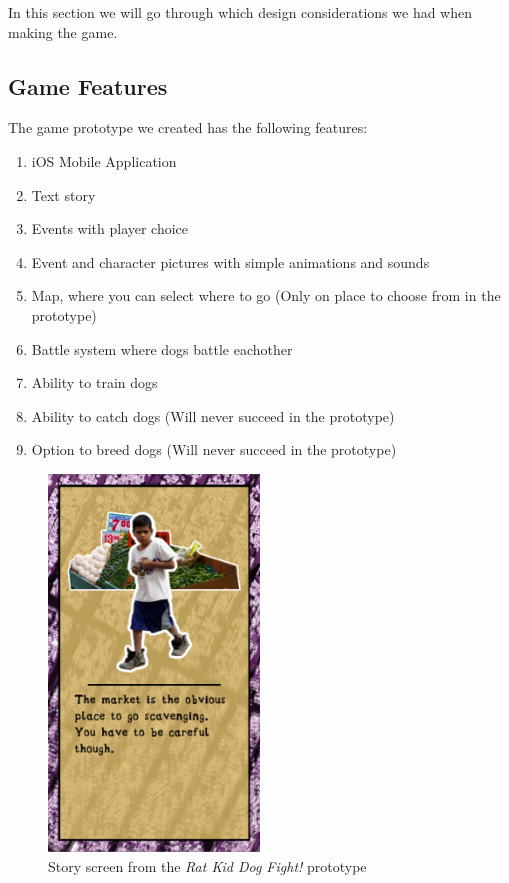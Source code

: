 In this section we will go through which design considerations we had when making the game.\

\subsection{Game Features}
The game prototype we created has the following features:

\begin{enumerate}
	\item iOS Mobile Application
	\item Text story
	\item Events with player choice
	\item Event and character pictures with simple animations and sounds
	\item Map, where you can select where to go (Only on place to choose from in the prototype)
	\item Battle system where dogs battle eachother
	\item Ability to train dogs
	\item Ability to catch dogs (Will never succeed in the prototype)
	\item Option to breed dogs (Will never succeed in the prototype)
\end{enumerate}

\begin{figure}[h!] 
	\centering
    \includegraphics[width=0.5\textwidth]{GameScreen1.png}
    \caption{Story screen from the \textit{Rat Kid Dog Fight!} prototype}
    \label{fig:GameScreen}
\end{figure}

